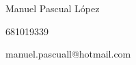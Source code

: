 \documentclass[12pt]{report} %
\begin{document}



Manuel Pascual López

681019339

manuel.pascuall@hotmail.com
\end{document}
